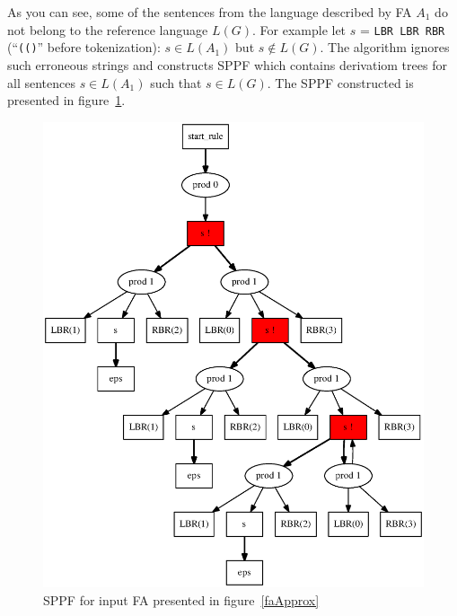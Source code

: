 As you can see, some of the sentences from the language described by FA $A_1$ do not belong to the reference language $L(G)$.
For example let $s$ = \verb|LBR LBR RBR| (``\verb|(()|'' before tokenization): $s \in L(A_1)$ but $s \notin L(G)$.
The algorithm ignores such erroneous strings and constructs SPPF which contains derivatiom trees for all sentences $s \in L(A_1)$ such that $s \in L(G)$.
The SPPF constructed is presented in figure~\ref{resultSPPF}.
\begin{figure}
    \begin{center}
        \includegraphics[scale=0.3]{dot/out3.eps}
    \end{center}
    \caption{SPPF for input FA presented in figure~\ref{faApprox}}
    \label{resultSPPF}
\end{figure}


